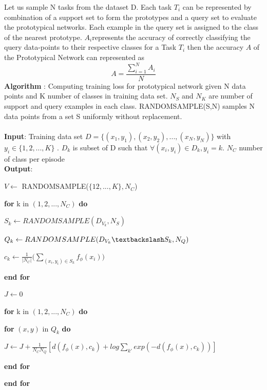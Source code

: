Let us sample N tasks from the dataset D. Each task \(T_i\) can be represented by combination of a support set to form the prototypes and a query set to evaluate the prototypical networks.
Each example in the query set is assigned to the class of the nearest prototype. \(A_i\)represents the accuracy of correctly classifying the query data-points to their respective classes for a Task \(T_i\) then the accuracy \(A\) of the Prototypical Network can represented as 
\[A = \frac{\sum_{i=1}^{N}A_i}{N}\]
\textbf{Algorithm} : Computing training loss for prototypical network given N data points and K number of classes in training data set. \(N_S\) and \(N_K\) are number of support and query examples in each class. RANDOMSAMPLE(S,N) samples N data points from a set S uniformly without replacement.\\\\
\textbf{Input}: Training data set \(D = \{(x_1,y_1),(x_2,y_2),...,(x_N,y_N)\}\) with \(y_i \in \{1,2,...,K\}\) . \(D_k\) is subset of D such that \(\forall(x_i,y_i)\in D_k, y_i=k\). \(N_C\) number of class per episode\\
\textbf{Output}: 

\quad \(V\leftarrow\) RANDOMSAMPLE(\(\{12,...,K\},N_C\))

\quad \textbf{for} k in \((1,2,...,N_C)\) \textbf{do}


\quad\quad\(S_k\leftarrow RANDOMSAMPLE(D_{V_k},N_S)\)

\quad\quad\(Q_k\leftarrow RANDOMSAMPLE(D_{V_k}\textbackslash S_k,N_Q)\)

\quad\quad\(c_k \leftarrow \frac{1}{|N_C|} \Big(\sum_{(x_i,y_i)\in S_k} f_\phi(x_i)\Big)\)


\quad\textbf{end for}

\quad\(J\leftarrow 0\)

\quad\textbf{for} k in \((1,2,...,N_C)\) \textbf{do}


\quad\quad\textbf{for} \((x,y)\) in \(Q_k\) \textbf{do}

\quad\quad\quad\(J\leftarrow  J + \frac{1}{N_C N_Q}[d(f_\phi(x),c_k)+log\sum_{k'}exp(-d(f_\phi(x),c_k))]\)

\quad\quad\textbf{end for}

\quad\textbf{end for}
